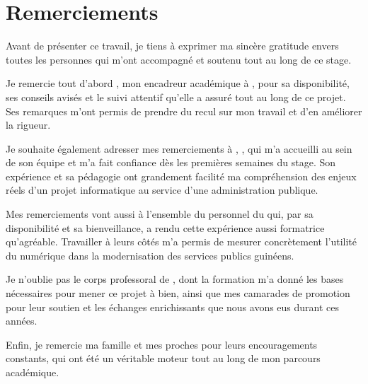 \chapter*{Remerciements}

Avant de présenter ce travail, je tiens à exprimer ma sincère gratitude envers toutes les personnes qui m'ont accompagné et soutenu tout au long de ce stage.

Je remercie tout d'abord \encadreurAcademique, mon encadreur académique à \ecole, pour sa disponibilité, ses conseils avisés et le suivi attentif qu'elle a assuré tout au long de ce projet. Ses remarques m'ont permis de prendre du recul sur mon travail et d'en améliorer la rigueur.

Je souhaite également adresser mes remerciements à \maitreDeStage, \maitreDeStageTitre, qui m'a accueilli au sein de son équipe et m'a fait confiance dès les premières semaines du stage. Son expérience et sa pédagogie ont grandement facilité ma compréhension des enjeux réels d'un projet informatique au service d'une administration publique.

Mes remerciements vont aussi à l'ensemble du personnel du \structureAccueil{} qui, par sa disponibilité et sa bienveillance, a rendu cette expérience aussi formatrice qu'agréable. Travailler à leurs côtés m'a permis de mesurer concrètement l'utilité du numérique dans la modernisation des services publics guinéens.

Je n'oublie pas le corps professoral de \ecole, dont la formation m'a donné les bases nécessaires pour mener ce projet à bien, ainsi que mes camarades de promotion pour leur soutien et les échanges enrichissants que nous avons eus durant ces années.

Enfin, je remercie ma famille et mes proches pour leurs encouragements constants, qui ont été un véritable moteur tout au long de mon parcours académique.
